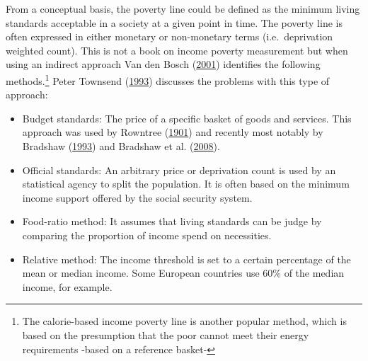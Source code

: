 \documentclass[]{book}
\providecommand{\tightlist}{%
  \setlength{\itemsep}{0pt}\setlength{\parskip}{0pt}}
\let\rmarkdownfootnote\footnote%
\def\footnote{\protect\rmarkdownfootnote}
\begin{document}
From a conceptual basis, the poverty line could be defined as the minimum living standards acceptable in a society at a given point in time. The poverty line is often expressed in either monetary or non-monetary terms (i.e.~deprivation weighted count). This is not a book on income poverty measurement but when using an indirect approach Van den Bosch (\protect\hyperlink{ref-VandenBosch2001}{2001}) identifies the following methods.\footnote{The calorie-based income poverty line is another popular method, which is based on the presumption that the poor cannot meet their energy requirements -based on a reference basket-} Peter Townsend (\protect\hyperlink{ref-Townsend1993}{1993}) discusses the problems with this type of approach:

\begin{itemize}
\tightlist
\item
  Budget standards: The price of a specific basket of goods and services. This approach was used by Rowntree (\protect\hyperlink{ref-Rowntree1901}{1901}) and recently most notably by Bradshaw (\protect\hyperlink{ref-Bradshaw1993}{1993}) and Bradshaw et al. (\protect\hyperlink{ref-Bradshaw2008}{2008}).
\item
  Official standards: An arbitrary price or deprivation count is used by an statistical agency to split the population. It is often based on the minimum income support offered by the social security system.
\item
  Food-ratio method: It assumes that living standards can be judge by comparing the proportion of income spend on necessities.
\item
  Relative method: The income threshold is set to a certain percentage of the mean or median income. Some European countries use 60\% of the median income, for example.
\end{itemize}
\end{document}
